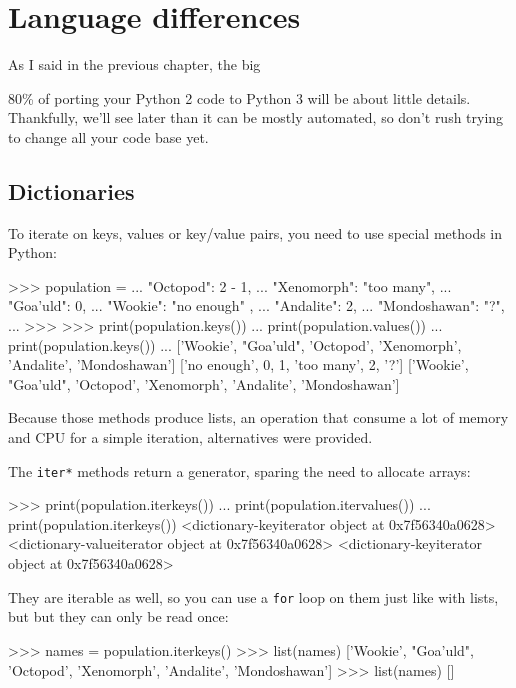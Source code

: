 
\chapter{Language differences}

As I said in the previous chapter, the big

80\% of porting your Python 2 code to Python 3 will be about little details. Thankfully, we'll see later than it can be mostly automated, so don't rush trying to change all your code base yet.


\section{Dictionaries}

To iterate on keys, values or key/value pairs, you need to use special methods in Python:

\begin{py2}
>>> population = {
...     "Octopod": 2 - 1,
...     "Xenomorph": "too many",
...     "Goa'uld": 0,
...     "Wookie": "no enough" ,
...     "Andalite": 2,
...     "Mondoshawan": "?",
... }
>>>
>>> print(population.keys())
... print(population.values())
... print(population.keys())
...
['Wookie', "Goa'uld", 'Octopod', 'Xenomorph', 'Andalite', 'Mondoshawan']
['no enough', 0, 1, 'too many', 2, '?']
['Wookie', "Goa'uld", 'Octopod', 'Xenomorph', 'Andalite', 'Mondoshawan']
\end{py2}

Because those methods produce lists, an operation that consume a lot of memory and CPU for a simple iteration, alternatives were provided.

The \lstinline{iter*} methods return a generator, sparing the need to allocate arrays:

\begin{py2}
>>> print(population.iterkeys())
... print(population.itervalues())
... print(population.iterkeys())
<dictionary-keyiterator object at 0x7f56340a0628>
<dictionary-valueiterator object at 0x7f56340a0628>
<dictionary-keyiterator object at 0x7f56340a0628>
\end{py2}

They are \gls{iterable} as well, so you can use a \lstinline{for} loop on them just like with lists, but but they can only be read once:

\begin{py2}
>>> names = population.iterkeys()
>>> list(names)
['Wookie', "Goa'uld", 'Octopod', 'Xenomorph', 'Andalite', 'Mondoshawan']
>>> list(names)
[]
\end{py2}

